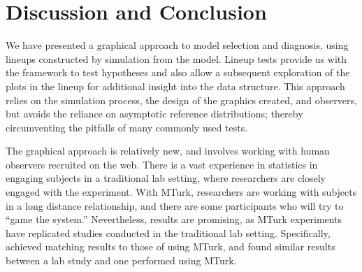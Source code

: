 \documentclass[12pt]{article}
\newcommand{\hhnote}[1]{\todo[inline,color=orange!40]{#1}}
\begin{document}
\section{Discussion and Conclusion}\label{sec:conclusion}

We have presented a graphical approach to model selection and diagnosis, using lineups constructed by simulation from the model. %
Lineup tests provide us with the framework to test hypotheses and also allow a  subsequent exploration of the plots in the lineup  for additional insight into the data structure. This approach relies  on the simulation process, the design of the graphics created, and observers, but avoids the reliance on asymptotic reference distributions; thereby circumventing the pitfalls of many commonly used tests. 


The graphical approach is relatively new, and involves working with human observers recruited on the web. There is a vast experience in statistics in engaging subjects in a traditional lab setting, where researchers are closely engaged with the experiment. With MTurk, researchers are working with subjects in a long distance relationship, and there are some participants who will try to ``game the system.'' Nevertheless, results are promising, as MTurk experiments have replicated studies conducted in the traditional lab setting. Specifically, \citet{heer:2010} achieved matching results to those of \citet{cleveland:1984} using MTurk, and \citet{kosara:2010} found similar results between a lab study and one performed using MTurk.
\end{document}
